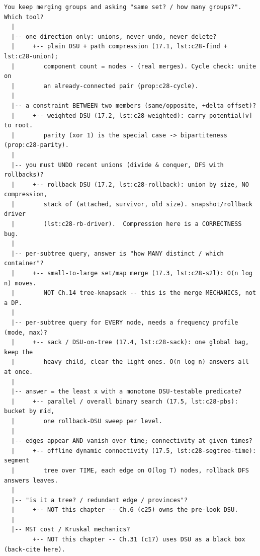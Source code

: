 \begin{lstlisting}[language={}, basicstyle=\ttfamily\small, numbers=none, frame=single]
  You keep merging groups and asking "same set? / how many groups?".  Which tool?
  |
  |-- one direction only: unions, never undo, never delete?
  |     +-- plain DSU + path compression (17.1, lst:c28-find + lst:c28-union);
  |        component count = nodes - (real merges). Cycle check: unite on
  |        an already-connected pair (prop:c28-cycle).
  |
  |-- a constraint BETWEEN two members (same/opposite, +delta offset)?
  |     +-- weighted DSU (17.2, lst:c28-weighted): carry potential[v] to root.
  |        parity (xor 1) is the special case -> bipartiteness (prop:c28-parity).
  |
  |-- you must UNDO recent unions (divide & conquer, DFS with rollbacks)?
  |     +-- rollback DSU (17.2, lst:c28-rollback): union by size, NO compression,
  |        stack of (attached, survivor, old size). snapshot/rollback driver
  |        (lst:c28-rb-driver).  Compression here is a CORRECTNESS bug.
  |
  |-- per-subtree query, answer is "how MANY distinct / which container"?
  |     +-- small-to-large set/map merge (17.3, lst:c28-s2l): O(n log n) moves.
  |        NOT Ch.14 tree-knapsack -- this is the merge MECHANICS, not a DP.
  |
  |-- per-subtree query for EVERY node, needs a frequency profile (mode, max)?
  |     +-- sack / DSU-on-tree (17.4, lst:c28-sack): one global bag, keep the
  |        heavy child, clear the light ones. O(n log n) answers all at once.
  |
  |-- answer = the least x with a monotone DSU-testable predicate?
  |     +-- parallel / overall binary search (17.5, lst:c28-pbs): bucket by mid,
  |        one rollback-DSU sweep per level.
  |
  |-- edges appear AND vanish over time; connectivity at given times?
  |     +-- offline dynamic connectivity (17.5, lst:c28-segtree-time): segment
  |        tree over TIME, each edge on O(log T) nodes, rollback DFS answers leaves.
  |
  |-- "is it a tree? / redundant edge / provinces"?
  |     +-- NOT this chapter -- Ch.6 (c25) owns the pre-look DSU.
  |
  |-- MST cost / Kruskal mechanics?
        +-- NOT this chapter -- Ch.31 (c17) uses DSU as a black box (back-cite here).
\end{lstlisting}


